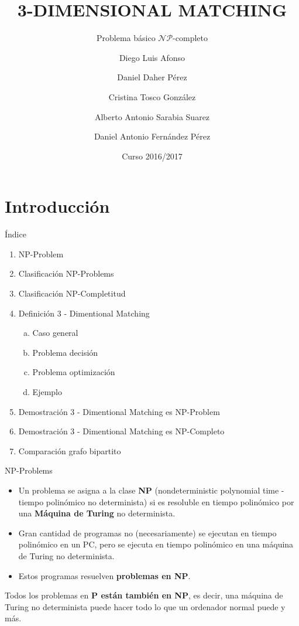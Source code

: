 \documentclass[10pt, mathserif, profesionalfont]{beamer}
\title{3-DIMENSIONAL MATCHING}
\subtitle{Problema básico $\mathcal{NP}$-completo}
\author{Diego Luis Afonso \and Daniel Daher Pérez \and Cristina Tosco González \and Alberto Antonio Sarabia Suarez \and Daniel Antonio Fernández Pérez}
\institute[ULL-ESIT-Escuela Superior de Ingeniería y Tecnología]{Universidad de La Laguna} %
\date{Curso 2016/2017}
\begin{document}
	
	\begin{frame}
		\titlepage
	\end{frame}
	
	
	
	
	\section{Introducción}
	
	\begin{frame}{Índice}
		
		\begin{enumerate}[1.]
			\item NP-Problem
			\item Clasificación NP-Problems
			\item Clasificación NP-Completitud
			\item Definición 3 - Dimentional Matching
			\begin{enumerate}[a)]
				\item Caso general
				\item Problema decisión
				\item Problema optimización
				\item Ejemplo
			\end{enumerate}
			\item Demostración 3 - Dimentional Matching es NP-Problem
			\item Demostración 3 - Dimentional Matching es NP-Completo
			\item Comparación grafo bipartito
		\end{enumerate}
		
	\end{frame}
	
	
	\begin{frame}{NP-Problems}
		\begin{block}{}
			\begin{itemize}
				\item Un problema se asigna a la clase {\textbf{NP}} (nondeterministic polynomial time - tiempo polinómico no determinista) si es resoluble en tiempo polinómico 
				por una {\textbf{Máquina de Turing}} no determinista.
				
				\item Gran cantidad de programas no (necesariamente) se ejecutan en tiempo polinómico en un PC, 
				pero se ejecuta en tiempo polinómico en una máquina de Turing no determinista.
				
				\item Estos programas resuelven {\textbf{problemas en NP}}.   
			\end{itemize}	
		\end{block}
		
		\begin{block}{}
			Todos los problemas en {\textbf{P están también en NP}}, es decir, una máquina de Turing no determinista puede hacer todo lo que un ordenador normal puede y más.
		\end{block}
	\end{frame}
	
\end{document}
